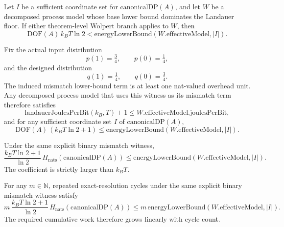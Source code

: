 \begin{proposition}\label{prop:strict-canonical-energy}
Let $I$ be a sufficient coordinate set for $\mathrm{canonicalDP}(A)$, and let $W$ be a decomposed process model whose base lower bound dominates the Landauer floor. If either theorem-level Wolpert branch applies to $W$, then
\[
\mathrm{DOF}(A)\,k_B T \ln 2
<
\mathrm{energyLowerBound}(W.\mathrm{effectiveModel},|I|).
\]
\end{proposition}

\begin{proposition}\label{prop:binary-mismatch-example}
Fix the actual input distribution
\[
p(1)=\tfrac34,
\qquad
p(0)=\tfrac14,
\]
and the designed distribution
\[
q(1)=\tfrac14,
\qquad
q(0)=\tfrac34.
\]
The induced mismatch lower-bound term is at least one nat-valued overhead unit. Any decomposed process model that uses this witness as its mismatch term therefore satisfies
\[
\mathrm{landauerJoulesPerBit}(k_B,T) + 1
\le
W.\mathrm{effectiveModel}.\mathrm{joulesPerBit},
\]
and for any sufficient coordinate set $I$ of $\mathrm{canonicalDP}(A)$,
\[
\mathrm{DOF}(A)\,(k_B T \ln 2 + 1)
\le
\mathrm{energyLowerBound}(W.\mathrm{effectiveModel},|I|).
\]
\end{proposition}

\begin{proposition}\label{prop:binary-mismatch-energy-information}
Under the same explicit binary mismatch witness,
\[
\frac{k_B T \ln 2 + 1}{\ln 2}
\, H_{\mathrm{nats}}(\mathrm{canonicalDP}(A))
\le
\mathrm{energyLowerBound}(W.\mathrm{effectiveModel},|I|).
\]
The coefficient is strictly larger than $k_B T$.
\end{proposition}

\begin{proposition}\label{prop:binary-mismatch-cumulative-work}
For any $m \in \mathbb{N}$, repeated exact-resolution cycles under the same explicit binary mismatch witness satisfy
\[
m\,\frac{k_B T \ln 2 + 1}{\ln 2}
\, H_{\mathrm{nats}}(\mathrm{canonicalDP}(A))
\le
m\,\mathrm{energyLowerBound}(W.\mathrm{effectiveModel},|I|).
\]
The required cumulative work therefore grows linearly with cycle count.
\end{proposition}


